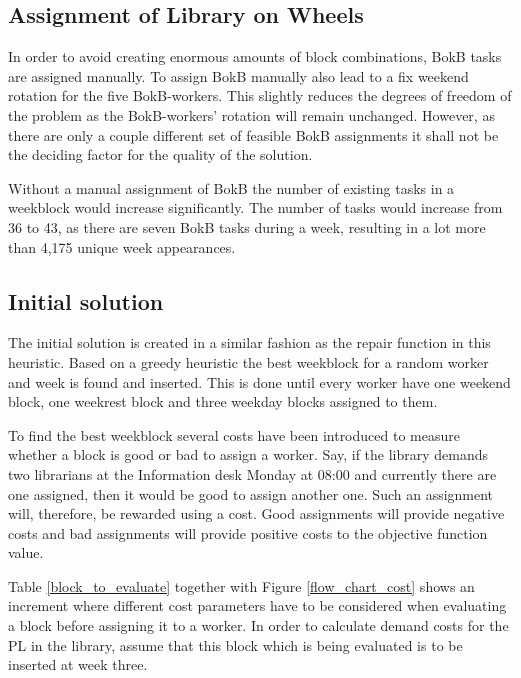 \subsection{Assignment of Library on Wheels} \label{BokB_assignment}
In order to avoid creating enormous amounts of block combinations, BokB tasks are assigned manually. To assign BokB manually also lead to a fix weekend rotation for the five BokB-workers. This slightly reduces the degrees of freedom of the problem as the BokB-workers' rotation will remain unchanged. However, as there are only a couple different set of feasible BokB assignments it shall not be the deciding factor for the quality of the solution.

Without a manual assignment of BokB the number of existing tasks in a weekblock would increase significantly. The number of tasks would increase from 36 to 43, as there are seven BokB tasks during a week, resulting in a lot more than 4,175 unique week appearances. %

\subsection{Initial solution} \label{initial_solution}
The initial solution is created in a similar fashion as the repair function in this heuristic. Based on a greedy heuristic the best weekblock for a random worker and week is found and inserted. This is done until every worker have one weekend block, one weekrest block and three weekday blocks assigned to them.

To find the best weekblock several costs have been introduced to measure whether a block is good or bad to assign a worker. Say, if the library demands two librarians at the Information desk Monday at 08:00 and currently there are one assigned, then it would be good to assign another one. Such an assignment will, therefore, be rewarded using a cost. Good assignments will provide negative costs and bad assignments will provide positive costs to the objective function value.

Table \ref{block_to_evaluate} together with Figure \ref{flow_chart_cost} shows an increment where different cost parameters have to be considered when evaluating a block before assigning it to a worker. In order to calculate demand costs for the PL in the library, assume that this block which is being evaluated is to be inserted at week three.

